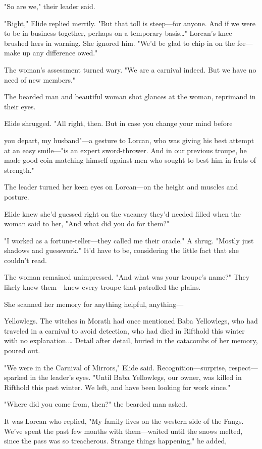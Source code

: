 "So are we," their leader said.

"Right," Elide replied merrily. "But that toll is steep---for anyone. And if we were to be in business together, perhaps on a temporary basis\ldots" Lorcan's knee brushed hers in warning. She ignored him. "We'd be glad to chip in on the fee--- make up any difference owed."

The woman's assessment turned wary. "We are a carnival indeed. But we have no need of new members."

The bearded man and beautiful woman shot glances at the woman, reprimand in their eyes.

Elide shrugged. "All right, then. But in case you change your mind before

you depart, my husband"---a gesture to Lorcan, who was giving his best attempt at an easy smile---"is an expert sword-thrower. And in our previous troupe, he made good coin matching himself against men who sought to best him in feats of strength."

The leader turned her keen eyes on Lorcan---on the height and muscles and posture.

Elide knew she'd guessed right on the vacancy they'd needed filled when the woman said to her, "And what did you do for them?"

"I worked as a fortune-teller---they called me their oracle." A shrug. "Mostly just shadows and guesswork." It'd have to be, considering the little fact that she couldn't read.

The woman remained unimpressed. "And what was your troupe's name?" They likely knew them---knew every troupe that patrolled the plains.

She scanned her memory for anything helpful, anything---

Yellowlegs. The witches in Morath had once mentioned Baba Yellowlegs, who had traveled in a carnival to avoid detection, who had died in Rifthold this winter with no explanation.\ldots{} Detail after detail, buried in the catacombs of her memory, poured out.

"We were in the Carnival of Mirrors," Elide said. Recognition---surprise, respect---sparked in the leader's eyes. "Until Baba Yellowlegs, our owner, was killed in Rifthold this past winter. We left, and have been looking for work since."

"Where did you come from, then?" the bearded man asked.

It was Lorcan who replied, "My family lives on the western side of the Fangs. We've spent the past few months with them---waited until the snows melted, since the pass was so treacherous. Strange things happening," he added,

